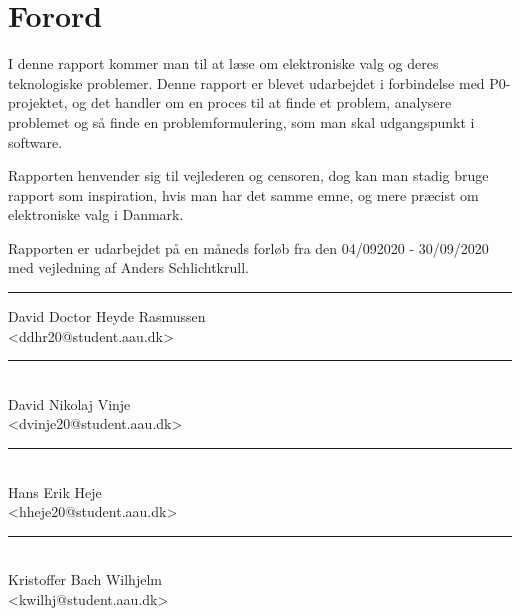 \section*{Forord}%
I denne rapport kommer man til at læse om elektroniske valg og deres teknologiske problemer. Denne rapport er blevet udarbejdet i forbindelse med P0-projektet, og det handler om en proces til at finde et problem, analysere problemet og så finde en problemformulering, som man skal udgangspunkt i software. 

Rapporten henvender sig til vejlederen og censoren, dog kan man stadig bruge rapport som inspiration, hvis man har det samme emne, og mere præcist om elektroniske valg i Danmark. 

Rapporten er udarbejdet på en måneds forløb fra den 04/092020 - 30/09/2020 med vejledning af Anders Schlichtkrull.

\vfill\noindent

\begin{center}
\begin{minipage}[b]{0.45\textwidth}
 \centering
 \rule{\textwidth}{0.5pt}
  David Doctor Heyde Rasmussen\\
 {\footnotesize <ddhr20@student.aau.dk>}
\end{minipage}
\hfill
\begin{minipage}[b]{0.45\textwidth}
 \centering
 \rule{\textwidth}{0.5pt}\\
  David Nikolaj Vinje\\
 {\footnotesize <dvinje20@student.aau.dk>}
\end{minipage}
\vspace{3\baselineskip}
\end{center}

\begin{center}
\begin{minipage}[b]{0.45\textwidth}
 \centering
 \rule{\textwidth}{0.5pt}\\
  Hans Erik Heje\\
 {\footnotesize <hheje20@student.aau.dk>}
\end{minipage}
\hfill
\begin{minipage}[b]{0.45\textwidth}
 \centering
 \rule{\textwidth}{0.5pt}\\
  Kristoffer Bach Wilhjelm\\
 {\footnotesize <kwilhj@student.aau.dk>}
\end{minipage}
\vspace{3\baselineskip}
\end{center}

